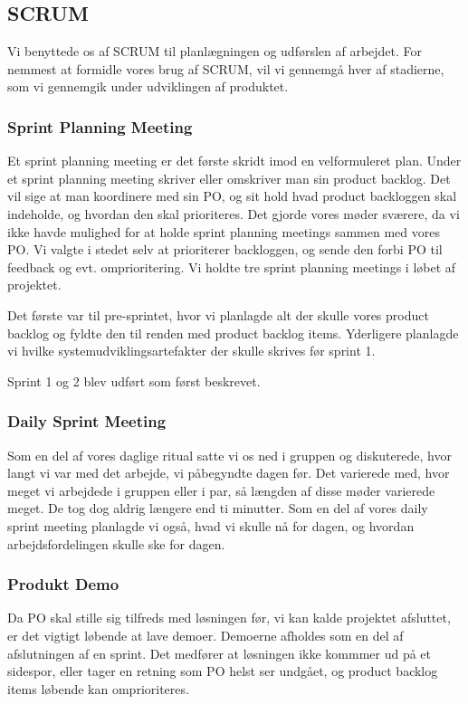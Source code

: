 \subsection{SCRUM}
Vi benyttede os af SCRUM til planlægningen og udførslen af arbejdet.
For nemmest at formidle vores brug af SCRUM, vil vi gennemgå hver af stadierne, som vi gennemgik under udviklingen af produktet. 

\subsubsection{Sprint Planning Meeting}
Et sprint planning meeting er det første skridt imod en velformuleret plan.
Under et sprint planning meeting skriver eller omskriver man sin product backlog.
Det vil sige at man koordinere med sin PO, og sit hold hvad product backloggen skal indeholde, og hvordan den skal prioriteres.
Det gjorde vores møder sværere, da vi ikke havde mulighed for at holde sprint planning meetings sammen med vores PO.
Vi valgte i stedet selv at prioriterer backloggen, og sende den forbi PO til feedback og evt. omprioritering.
Vi holdte tre sprint planning meetings i løbet af projektet.\cite{scrum} 

Det første var til pre-sprintet, hvor vi planlagde alt der skulle vores product backlog og fyldte den til renden med product backlog items.
Yderligere planlagde vi hvilke systemudviklingsartefakter der skulle skrives før sprint 1.

Sprint 1 og 2 blev udført som først beskrevet.

\subsubsection{Daily Sprint Meeting}
Som en del af vores daglige ritual satte vi os ned i gruppen og diskuterede, hvor langt vi var med det arbejde, vi påbegyndte dagen før.
Det varierede med, hvor meget vi arbejdede i gruppen eller i par, så længden af disse møder varierede meget.
De tog dog aldrig længere end ti minutter.
Som en del af vores daily sprint meeting planlagde vi også, hvad vi skulle nå for dagen, og hvordan arbejdsfordelingen skulle ske for dagen.

\subsubsection{Produkt Demo}
Da PO skal stille sig tilfreds med løsningen før, vi kan kalde projektet afsluttet, er det vigtigt løbende at lave demoer.
Demoerne afholdes som en del af afslutningen af en sprint.
Det medfører at løsningen ikke kommmer ud på et sidespor, eller tager en retning som PO helst ser undgået, og product backlog items løbende kan omprioriteres.

